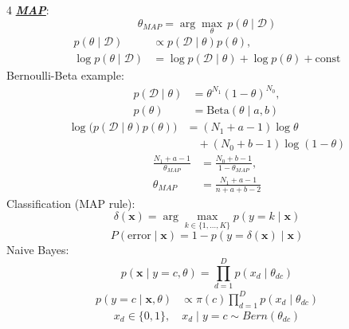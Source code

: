 \documentclass[12pt]{article}
\newcommand{\bulletPoint}[1]{\ul{\textit{\textbf{#1}}}}
\begin{document}
\begin{multicols*}{4}
\bulletPoint{MAP}:
\useshortskip \begin{equation*}
    \theta_{MAP}=\arg\max_{\theta}\,p(\theta\mid\mathcal{D})
\end{equation*}
\useshortskip \begin{equation*}
    \begin{split}
        p(\theta\mid\mathcal{D})
        &\propto p(\mathcal{D}\mid\theta)p(\theta),\\
        \log p(\theta\mid\mathcal{D})
        &=\log p(\mathcal{D}\mid\theta)+\log p(\theta)+\mathrm{const}
    \end{split}
\end{equation*}
Bernoulli-Beta example:
\useshortskip \begin{equation*}
    \begin{split}
        p(\mathcal{D}\mid\theta)&=\theta^{N_1}(1-\theta)^{N_0},\\
        p(\theta)&=\mathrm{Beta}(\theta\mid a,b)
    \end{split}
\end{equation*}
\useshortskip \begin{equation*}
    \begin{split}
        \log\!\big(p(\mathcal{D}\mid\theta)p(\theta)\big)
        &=(N_1+a-1)\log\theta\\
        &\quad +(N_0+b-1)\log(1-\theta)
    \end{split}
\end{equation*}
\useshortskip \begin{equation*}
    \begin{split}
        \frac{N_1+a-1}{\theta_{MAP}}
        &=\frac{N_0+b-1}{1-\theta_{MAP}},\\
        \theta_{MAP}
        &=\frac{N_1+a-1}{n+a+b-2}
    \end{split}
\end{equation*}
Classification (MAP rule):
\useshortskip \begin{equation*}
    \delta(\mathbf{x})=\arg\max_{k\in\{1,\ldots,K\}}p(y=k\mid \mathbf{x})
\end{equation*}
\useshortskip \begin{equation*}
    P(\text{error}\mid\mathbf{x})
    =1-p\!\left(y=\delta(\mathbf{x})\mid\mathbf{x}\right)
\end{equation*}
Naive Bayes:
\useshortskip \begin{equation*}
    p(\mathbf{x}\mid y=c,\theta)
    =\prod_{d=1}^{D}p(x_d\mid \theta_{dc})
\end{equation*}
\useshortskip \begin{equation*}
    \begin{split}
        p(y=c\mid\mathbf{x},\theta)
        &\propto \pi(c)\prod_{d=1}^{D}p(x_d\mid \theta_{dc})
    \end{split}
\end{equation*}
\useshortskip \begin{equation*}
    x_d\in\{0,1\},\quad x_d\mid y=c\sim Bern(\theta_{dc})
\end{equation*}


\end{multicols*}
\end{document}
